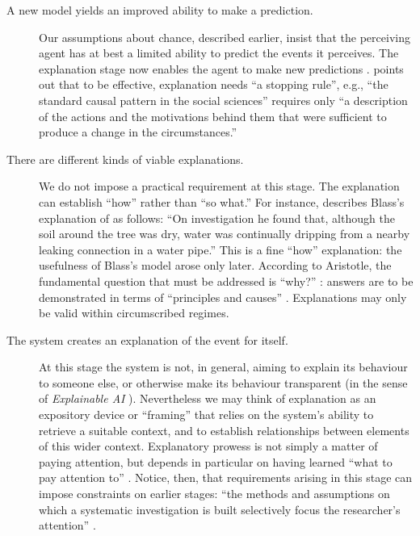 \begin{description}
\item[A new model yields an improved ability to make a prediction.]
  Our assumptions about chance, described earlier, insist that the
  perceiving agent has at best a limited ability to predict the events
  it perceives.  The explanation stage now enables the agent to make
  new predictions \cite[p.~389]{sowa2000knowledge}.
  \citet[p.~101]{swirski2000between} points out that to be effective,
  explanation needs ``a stopping rule'', e.g., ``the standard causal
  pattern in the social sciences'' requires only ``a description of
  the actions and the motivations behind them that were sufficient to
  produce a change in the circumstances.''
\item[There are different kinds of viable explanations.] We do not
  impose a practical requirement at this stage.  The explanation can
  establish ``how'' rather than ``so what.''  For instance,
  \citet{van1994anatomy} describes Blass's explanation of as follows:
  ``On investigation he found that, although the soil around the tree
  was dry, water was continually dripping from a nearby leaking
  connection in a water pipe.''  This is a fine ``how'' explanation:
  the usefulness of Blass's model arose only later.  According to
  Aristotle, the fundamental question that must be addressed is
  ``why?''  \cite{sep-aristotle-causality}: answers are to be
  demonstrated in terms of ``principles and causes'' \cite[Book Gamma,
    p.~81]{lawson1998metaphysics}.  Explanations may only be valid
  within circumscribed regimes.
\item[The system creates an explanation of the event for itself.]  At
  this stage the system is not, in general, aiming to explain its
  behaviour to someone else, or otherwise make its behaviour transparent
  (in the sense of \emph{Explainable AI}
  \cite{lane2005explainable}).  Nevertheless we may think of
  explanation as an expository device or ``framing''
  \cite{pease2011computational} that relies on the system's ability to
  retrieve a suitable context, and to establish relationships between
  elements of this wider context.  Explanatory prowess is not simply a
  matter of paying attention, but depends in particular on having
  learned ``what to pay attention to'' \cite[p.~4]{levin1975bateson}.
  Notice, then, that requirements arising in this stage can impose
  constraints on earlier stages: ``the methods and assumptions
  on which a systematic investigation is built selectively focus the
  researcher's attention''
  \cite[p.~131]{floppyearedrabbits1958barber}.
\end{description}
                                         
